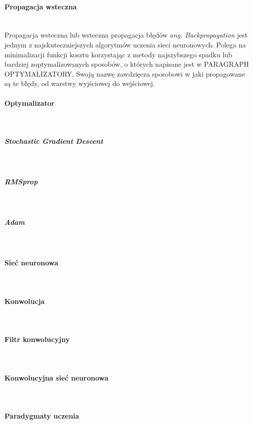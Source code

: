 \paragraph{Propagacja wsteczna} \mbox{}\\
Propagacja wsteczna lub wsteczna propagacja błędów \textit{ang. Backpropagation}
jest jednym z najskuteczniejszych algorytmów uczenia sieci neuronowych. Polega
na minimalizacji funkcji kosztu korzystając z metody najszybszego spadku lub
bardziej zoptymalizowanych sposobów, o których napisane jest w PARAGRAPH OPTYMALIZATORY.
Swoją nazwę zawdzięcza sposobowi w jaki propagowane są te błędy, od warstwy
wyjściowej do wejściowej.

\paragraph{Optymalizator} \mbox{}\\

\subparagraph{Stochastic Gradient Descent} \mbox{}\\

\subparagraph{RMSprop} \mbox{}\\

\subparagraph{Adam} \mbox{}\\


\paragraph{Sieć neuronowa} \mbox{}\\

\paragraph{Konwolucja} \mbox{}\\

\paragraph{Filtr konwolucyjny} \mbox{}\\

\paragraph{Konwolucyjna sieć neuronowa} \mbox{}\\

\paragraph{Paradygmaty uczenia} \mbox{}\\

